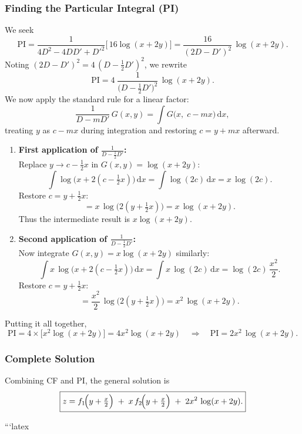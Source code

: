 \documentclass{article}
\theoremstyle{remark}
\begin{document}
	\subsubsection{Finding the Particular Integral (PI)}
	We seek
	\[
	\mathrm{PI}
	= \frac{1}{4D^2 - 4DD' + D'^2}\bigl[\,16\log(x+2y)\bigr]
	= \frac{16}{(2D - D')^2}\,\log(x+2y).
	\]
	Noting \((2D - D')^2 = 4\,(D - \tfrac12D')^2\), we rewrite
	\[
	\mathrm{PI}
	= 4\;\frac{1}{\bigl(D - \tfrac12D'\bigr)^2}\,\log(x+2y).
	\]
	We now apply the standard rule for a linear factor:
	\[
	\frac{1}{D - mD'}\,G(x,y)
	=\int G\bigl(x,\;c - m x\bigr)\,\mathrm{d}x,
	\]
	treating \(y\) as \(c-mx\) during integration and restoring \(c=y+mx\) afterward.
	
	\begin{enumerate}
		\item \textbf{First application of \(\frac{1}{D - \tfrac12D'}\):}\\
		Replace \(y\to c - \tfrac12x\) in \(G(x,y)=\log(x+2y)\):
		\[
		\int \log\bigl(x + 2(c - \tfrac12x)\bigr)\,\mathrm{d}x
		= \int \log(2c)\,\mathrm{d}x
		= x\,\log(2c).
		\]
		Restore \(c=y+\tfrac12x\):
		\[
		= x\,\log\!\bigl(2(y+\tfrac12x)\bigr)
		= x\,\log(x+2y).
		\]
		Thus the intermediate result is \(x\log(x+2y)\).
		
		\item \textbf{Second application of \(\frac{1}{D - \tfrac12D'}\):}\\
		Now integrate \(G(x,y)=x\log(x+2y)\) similarly:
		\[
		\int x\,\log\bigl(x + 2(c - \tfrac12x)\bigr)\,\mathrm{d}x
		= \int x\,\log(2c)\,\mathrm{d}x
		= \log(2c)\,\frac{x^2}{2}.
		\]
		Restore \(c=y+\tfrac12x\):
		\[
		= \frac{x^2}{2}\,\log\!\bigl(2(y+\tfrac12x)\bigr)
		= x^2\,\log(x+2y).
		\]
	\end{enumerate}
	
	Putting it all together,
	\[
	\mathrm{PI}
	= 4 \times \bigl[x^2\log(x+2y)\bigr]
	= 4x^2\log(x+2y)
	\quad\Longrightarrow\quad
	\boxed{\mathrm{PI} = 2x^2\,\log(x+2y).}
	\]
	
	\subsubsection{Complete Solution}
	Combining CF and PI, the general solution is
	\[
	\boxed{%
		z = f_1\!\Bigl(y+\tfrac{x}{2}\Bigr)
		\;+\;
		x\,f_2\!\Bigl(y+\tfrac{x}{2}\Bigr)
		\;+\;
		2x^2\,\log(x+2y).%
	}
	\]
	
	```latex
\end{document}
